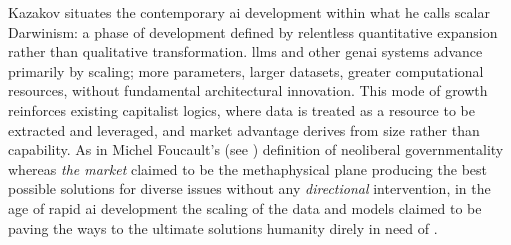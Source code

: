 \redsquare
Kazakov \parencite*{kazakov2025} situates the contemporary \gls{ai} development within what he calls scalar Darwinism: a phase of development defined by relentless quantitative expansion rather than qualitative transformation. \Glspl{llm}  and other \gls{genai}  systems advance primarily by scaling; more parameters, larger datasets, greater computational resources, without fundamental architectural innovation. This mode of growth reinforces existing capitalist logics, where data is treated as a resource to be extracted and leveraged, and market advantage derives from size rather than capability. As in Michel Foucault's (see \cite*[131]{foucault2008}) definition of neoliberal governmentality whereas \textit{the market} claimed to be the methaphysical plane producing the best possible solutions for diverse issues without any \textit{directional} intervention, in the age of rapid \gls{ai} development the scaling of the data and models claimed to be paving the ways to the ultimate solutions humanity direly in need of .


